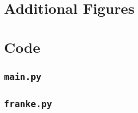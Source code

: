\documentclass[aps,pra,english,notitlepage,reprint,nofootinbib]{revtex4-1}  %
\begin{document}
\section{Additional Figures}\label{appsec:figures}

\section{Code}\label{appsec:code}
\subsection*{\texorpdfstring{\texttt{main.py}}{Lg}}\label{appsubsec:main}

\subsection*{\texorpdfstring{\texttt{franke.py}}{Lg}}\label{appsubsec:franke}






\end{document}
